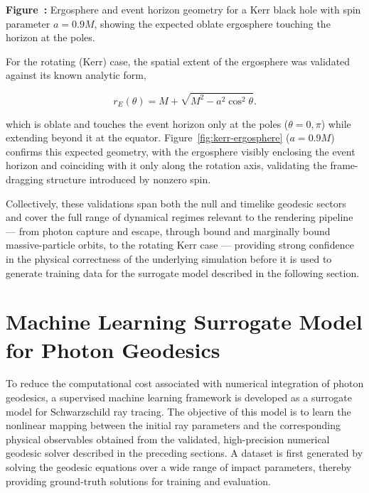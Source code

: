 \documentclass[12pt]{article}
\begin{document}
\begin{itemize}
\begin{itemize}
{\vspace{1mm}

\footnotesize
\textbf{Figure~\thefigure:}
Ergosphere and event horizon geometry for a Kerr black hole with
spin parameter $a=0.9M$, showing the expected oblate ergosphere
touching the horizon at the poles.
\label{fig:kerr-ergosphere}
}
\hfill
\parbox[t]{0.64\linewidth}{
\vspace{0pt}
For the rotating (Kerr) case, the spatial extent of the ergosphere
was validated against its known analytic form,

\begin{equation}
r_E(\theta)
=
M+\sqrt{M^2-a^2\cos^2\theta}.
\end{equation}

which is oblate and touches the event horizon only at the poles
($\theta=0,\pi$) while extending beyond it at the equator.
Figure~\ref{fig:kerr-ergosphere} ($a=0.9M$) confirms this expected
geometry, with the ergosphere visibly enclosing the event horizon
and coinciding with it only along the rotation axis, validating
the frame-dragging structure introduced by nonzero spin.
}

\vspace{5mm}


\end{itemize}


Collectively, these validations span both the null and timelike
geodesic sectors and cover the full range of dynamical regimes relevant
to the rendering pipeline --- from photon capture and escape, through
bound and marginally bound massive-particle orbits, to the rotating
Kerr case --- providing strong confidence in the physical correctness
of the underlying simulation before it is used to generate training
data for the surrogate model described in the following section.


\section{Machine Learning Surrogate Model for Photon Geodesics}

To reduce the computational cost associated with numerical integration of photon geodesics, a supervised machine learning framework is developed as a surrogate model for Schwarzschild ray tracing. The objective of this model is to learn the nonlinear mapping between the initial ray parameters and the corresponding physical observables obtained from the validated, high-precision numerical geodesic solver described in the preceding sections. A dataset is first generated by solving the geodesic equations over a wide range of impact parameters, thereby providing ground-truth solutions for training and evaluation.


\end{itemize}
\end{document}
